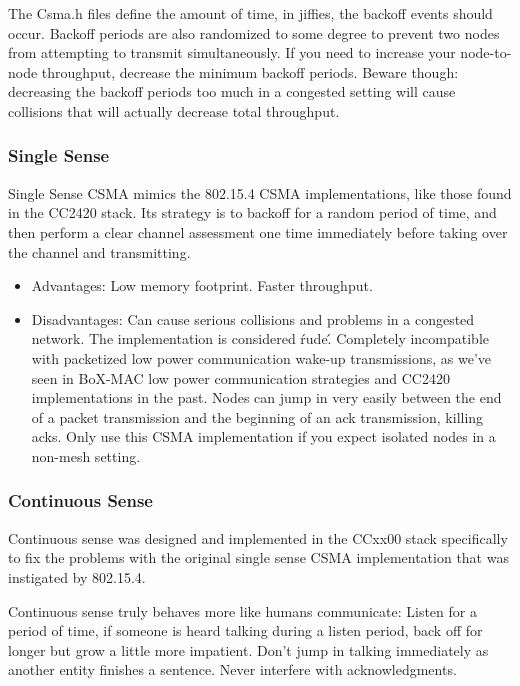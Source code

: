 \documentclass{article}
\begin{document}
The Csma.h files define the amount of time, in jiffies, the backoff
events should occur.  Backoff periods are also randomized to some
degree to prevent two nodes from attempting to transmit simultaneously.
If you need to increase your node-to-node throughput, decrease the minimum backoff periods. Beware though: decreasing the backoff periods
too much in a congested setting will cause collisions that will actually
decrease total throughput. 

\subsubsection{Single Sense}
\label{sec:singlesense}
Single Sense CSMA mimics the 802.15.4 CSMA implementations, like those
found in the CC2420 stack.  Its strategy is to backoff for a random
period of time, and then perform a clear channel assessment one time immediately before taking over the channel and transmitting.

\begin{itemize}
  \item Advantages: Low memory footprint. Faster throughput.
  \item Disadvantages: Can cause serious collisions and problems in a 
  congested network. The implementation is considered \'rude\'. 
  Completely incompatible with packetized low power communication wake-up 
  transmissions, as we've seen in BoX-MAC low power communication 
  strategies and CC2420 implementations in the past. Nodes can 
  jump in very easily between the end of a packet transmission
  and the beginning of an ack transmission, killing acks. Only use this
  CSMA implementation if you expect isolated nodes in a non-mesh
  setting.
\end{itemize}

\subsubsection{Continuous Sense}
\label{sec:continuoussense}
Continuous sense was designed and implemented in the CCxx00 stack
specifically to fix the problems with the original single sense CSMA implementation that was instigated by 802.15.4.

Continuous sense truly behaves more like humans communicate: Listen
for a period of time, if someone is heard talking during a listen period,
back off for longer but grow a little more impatient. Don't jump
in talking immediately as another entity finishes a sentence. Never interfere with acknowledgments.
\end{document}
